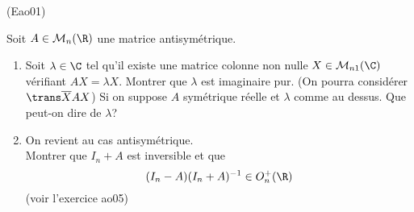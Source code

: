 \begin{tiny}(Eao01)\end{tiny} Soit $A\in \mathcal{M}_n(\R)$ une matrice antisymétrique.
\begin{enumerate}
 \item  Soit $\lambda \in \C$ tel qu'il existe une matrice colonne non nulle $X \in \mathcal{M}_{n 1}(\C)$ vérifiant $AX=\lambda X$. Montrer que $\lambda$ est imaginaire pur. (On pourra considérer $\trans \overline{X} A X$)\newline
Si on suppose $A$ symétrique réelle et $\lambda$ comme au dessus. Que peut-on dire de $\lambda$?
\item On revient au cas antisymétrique.\\ Montrer que $I_n+A$ est inversible et que 
\begin{displaymath}
 (I_n-A)(I_n+A)^{-1}\in O_n^+(\R)
\end{displaymath}
(voir l'exercice ao05)
\end{enumerate}

